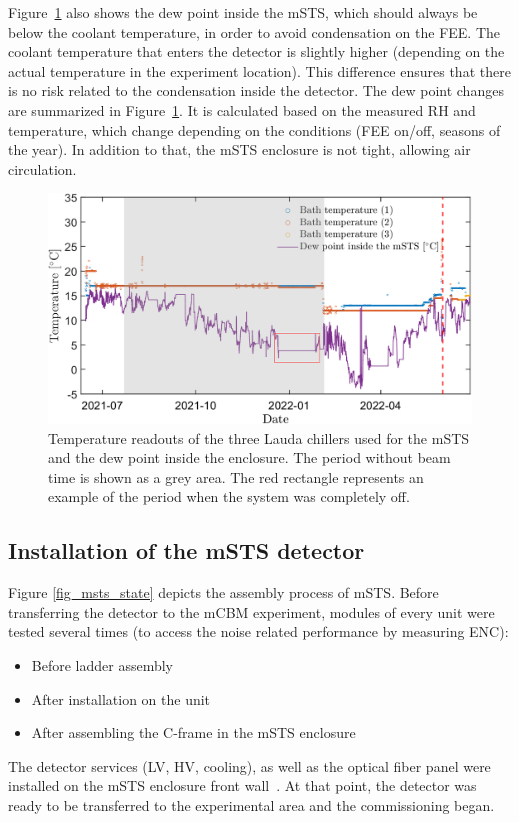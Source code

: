 Figure~\ref{fig_cooling} also shows the dew point inside the \gls{mSTS}, which should always be below the coolant temperature, in order to avoid condensation on the \gls{FEE}. The coolant temperature that enters the detector is slightly higher (depending on the actual temperature in the experiment location). This difference ensures that there is no risk related to the condensation inside the detector. The dew point changes are summarized in Figure~\ref{fig_cooling}. It is calculated based on the measured \gls{RH} and temperature, which change depending on the conditions (\gls{FEE} on/off, seasons of the year). In addition to that, the \gls{mSTS} enclosure is not tight,  allowing air circulation.
\begin{figure}[!h]
\centering
\includegraphics[width=0.95\columnwidth]{Chapter6/DCS/images/cooling.png}
\caption{Temperature readouts of the three Lauda chillers used for the \gls{mSTS} and the dew point inside the enclosure. The period without beam time is shown as a grey area. The red rectangle represents an example of the period when the system was completely off.}
\label{fig_cooling}
\end{figure}

\subsection{Installation of the mSTS detector}
Figure \ref{fig_msts_state} depicts the assembly process of \gls{mSTS}. Before transferring the detector to the \gls{mCBM} experiment, modules of every unit were tested several times (to access the noise related performance by measuring ENC):
\begin{itemize}
    \item Before ladder assembly
    \item After installation on the unit
    \item After assembling the C-frame in the mSTS enclosure
\end{itemize}
The detector services (\gls{LV}, \gls{HV}, cooling), as well as the optical fiber panel were installed on the \gls{mSTS} enclosure front wall~\cite{tekli1}. At that point, the detector was ready to be transferred to the experimental area and the commissioning began.

